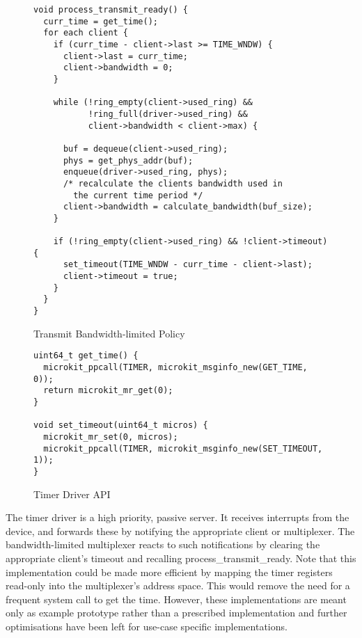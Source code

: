 \begin{figure} [H]
    \begin{verbatim}
void process_transmit_ready() {
  curr_time = get_time();
  for each client {
    if (curr_time - client->last >= TIME_WNDW) {
      client->last = curr_time;
      client->bandwidth = 0;
    }
    
    while (!ring_empty(client->used_ring) && 
           !ring_full(driver->used_ring) && 
           client->bandwidth < client->max) {

      buf = dequeue(client->used_ring);
      phys = get_phys_addr(buf);
      enqueue(driver->used_ring, phys);
      /* recalculate the clients bandwidth used in 
        the current time period */ 
      client->bandwidth = calculate_bandwidth(buf_size);
    }

    if (!ring_empty(client->used_ring) && !client->timeout) {
      set_timeout(TIME_WNDW - curr_time - client->last);
      client->timeout = true;
    }
  }
}
\end{verbatim}
\caption{Transmit Bandwidth-limited Policy}
\label{l:bandwidth}
\end{figure}

\begin{figure} [H]
    \begin{verbatim}
uint64_t get_time() {
  microkit_ppcall(TIMER, microkit_msginfo_new(GET_TIME, 0));
  return microkit_mr_get(0);
}
        
void set_timeout(uint64_t micros) {
  microkit_mr_set(0, micros);
  microkit_ppcall(TIMER, microkit_msginfo_new(SET_TIMEOUT, 1));
}
\end{verbatim}
\caption{Timer Driver API}
\label{l:timer}
\end{figure}

The timer driver is a high priority, passive server. It receives interrupts from the device,
and forwards these by notifying the appropriate client or multiplexer. The bandwidth-limited
multiplexer reacts to such notifications by clearing the appropriate client's timeout and
recalling process\_transmit\_ready. Note that this implementation could be made more efficient
by mapping the timer registers read-only into the multiplexer's address space. This would remove
the need for a frequent system call to get the time. However, these implementations are 
meant only as example prototype rather than a prescribed implementation and further optimisations
have been left for use-case specific implementations. \\

